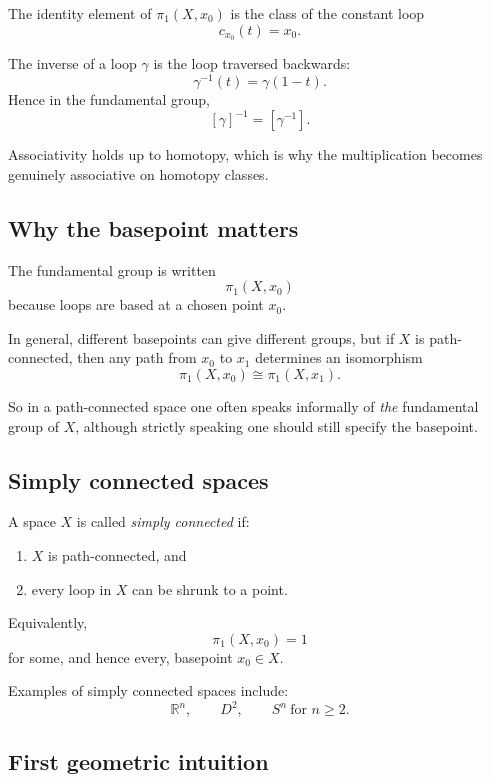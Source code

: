 \documentclass[12pt,a4paper]{article}
\theoremstyle{notespace}
\begin{document}
The identity element of \(\pi_1(X,x_0)\) is the class of the constant loop
\[
c_{x_0}(t)=x_0.
\]

The inverse of a loop \(\gamma\) is the loop traversed backwards:
\[
\gamma^{-1}(t)=\gamma(1-t).
\]
Hence in the fundamental group,
\[
[\gamma]^{-1}=[\gamma^{-1}].
\]

Associativity holds up to homotopy, which is why the multiplication becomes genuinely associative on homotopy classes.

\bigskip

\subsection{Why the basepoint matters}

The fundamental group is written
\[
\pi_1(X,x_0)
\]
because loops are based at a chosen point \(x_0\).

In general, different basepoints can give different groups, but if \(X\) is path-connected, then any path from \(x_0\) to \(x_1\) determines an isomorphism
\[
\pi_1(X,x_0)\cong \pi_1(X,x_1).
\]

So in a path-connected space one often speaks informally of \emph{the} fundamental group of \(X\), although strictly speaking one should still specify the basepoint.

\bigskip

\subsection{Simply connected spaces}

A space \(X\) is called \emph{simply connected} if:
\begin{enumerate}
	\item \(X\) is path-connected, and
	\item every loop in \(X\) can be shrunk to a point.
\end{enumerate}

Equivalently,
\[
\pi_1(X,x_0)=1
\]
for some, and hence every, basepoint \(x_0\in X\).

Examples of simply connected spaces include:
\[
\mathbb R^n,\qquad D^2,\qquad S^n\ \text{for }n\ge 2.
\]

\bigskip

\subsection{First geometric intuition}
\end{document}
